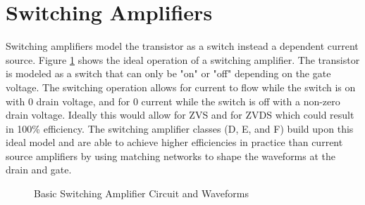 \section{Switching Amplifiers}

Switching amplifiers model the transistor as a switch instead a dependent current source. Figure \ref{fig:basic_switch} shows the ideal operation of a switching amplifier. The transistor is modeled as a switch that can only be "on" or "off" depending on the gate voltage. The switching operation allows for current to flow while the switch is on with 0 drain voltage, and for 0 current while the switch is off with a non-zero drain voltage. Ideally this would allow for ZVS and for ZVDS which could result in 100\% efficiency. The switching amplifier classes (D, E, and F) build upon this ideal model and are able to achieve higher efficiencies in practice than current source amplifiers by using matching networks to shape the waveforms at the drain and gate.

\begin{figure}
    \caption{Basic Switching Amplifier Circuit and Waveforms\cite{C.Cripps2006}}\label{fig:basic_switch}
\end{figure}

